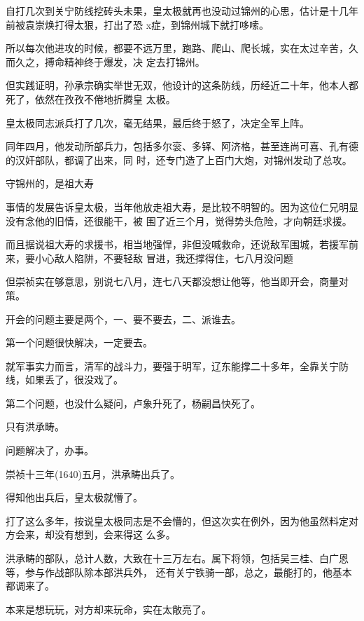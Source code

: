 \documentclass[11pt,a4paper,onecolumn]{article}
\begin{document}
自打几次到关宁防线挖砖头未果，皇太极就再也没动过锦州的心思，估计是十几年前被袁崇焕打得太狠，打出了恐
x症，到锦州城下就打哆嗦。

所以每次他进攻的时候，都要不远万里，跑路、爬山、爬长城，实在太过辛苦，久而久之，搏命精神终于爆发，决
定去打锦州。

但实践证明，孙承宗确实举世无双，他设计的这条防线，历经近二十年，他本人都死了，依然在孜孜不倦地折腾皇
太极。

皇太极同志派兵打了几次，毫无结果，最后终于怒了，决定全军上阵。

同年四月，他发动所部兵力，包括多尔衮、多铎、阿济格，甚至连尚可喜、孔有德的汉奸部队，都调了出来，同
时，还专门造了上百门大炮，对锦州发动了总攻。

守锦州的，是祖大寿

事情的发展告诉皇太极，当年他放走祖大寿，是比较不明智的。因为这位仁兄明显没有念他的旧情，还很能干，被
围了近三个月，觉得势头危险，才向朝廷求援。

而且据说祖大寿的求援书，相当地强悍，非但没喊救命，还说敌军围城，若援军前来，要小心敌人陷阱，不要轻敌
冒进，我还撑得住，七八月没问题

但崇祯实在够意思，别说七八月，连七八天都没想让他等，他当即开会，商量对策。

开会的问题主要是两个，一、要不要去，二、派谁去。

第一个问题很快解决，一定要去。

就军事实力而言，清军的战斗力，要强于明军，辽东能撑二十多年，全靠关宁防线，如果丢了，很没戏了。

第二个问题，也没什么疑问，卢象升死了，杨嗣昌快死了。

只有洪承畴。

问题解决了，办事。

崇祯十三年(1640)五月，洪承畴出兵了。

得知他出兵后，皇太极就懵了。

打了这么多年，按说皇太极同志是不会懵的，但这次实在例外，因为他虽然料定对方会来，却没有想到，会来得这
么多。

洪承畴的部队，总计人数，大致在十三万左右。属下将领，包括吴三桂、白广恩等，参与作战部队除本部洪兵外，
还有关宁铁骑一部，总之，最能打的，他基本都调来了。

本来是想玩玩，对方却来玩命，实在太敞亮了。

\section[\thesection]{}
\end{document}
